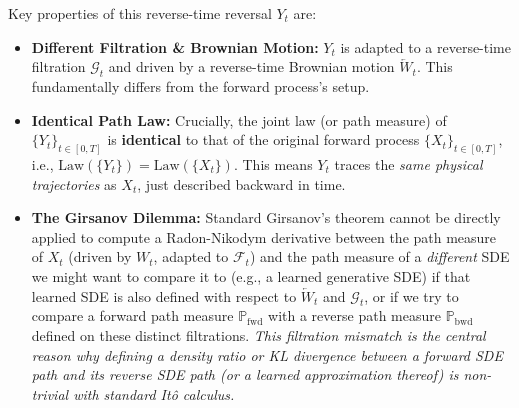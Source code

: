 Key properties of this reverse-time reversal $Y_t$ are:
\begin{itemize}
    \item \textbf{Different Filtration \& Brownian Motion:} $Y_t$ is adapted to a reverse-time filtration $\mathcal{G}_t$ and driven by a reverse-time Brownian motion $\overleftarrow{W}_t$. This fundamentally differs from the forward process's setup.
    \item \textbf{Identical Path Law:} Crucially, the joint law (or path measure) of $\{Y_t\}_{t \in [0,T]}$ is \textbf{identical} to that of the original forward process $\{X_t\}_{t \in [0,T]}$, i.e., $\text{Law}(\{Y_t\}) = \text{Law}(\{X_t\})$. This means $Y_t$ traces the \emph{same physical trajectories} as $X_t$, just described backward in time.
    \item \textbf{The Girsanov Dilemma:} Standard Girsanov's theorem cannot be directly applied to compute a Radon-Nikodym derivative between the path measure of $X_t$ (driven by $W_t$, adapted to $\mathcal{F}_t$) and the path measure of a \emph{different} SDE we might want to compare it to (e.g., a learned generative SDE) if that learned SDE is also defined with respect to $\overleftarrow{W}_t$ and $\mathcal{G}_t$, or if we try to compare a forward path measure $\mathbb{P}_{\text{fwd}}$ with a reverse path measure $\mathbb{P}_{\text{bwd}}$ defined on these distinct filtrations. \emph{This filtration mismatch is the central reason why defining a density ratio or KL divergence between a forward SDE path and its reverse SDE path (or a learned approximation thereof) is non-trivial with standard Itô calculus.}
\end{itemize}

